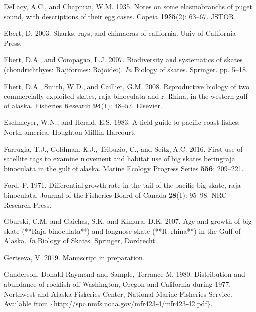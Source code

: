 \documentclass[12pt,]{article}
\begin{document}
\leavevmode\hypertarget{ref-DeLacy1935}{}%
DeLacy, A.C., and Chapman, W.M. 1935. Notes on some elasmobranchs of
puget sound, with descriptions of their egg cases. Copeia
\textbf{1935}(2): 63--67. JSTOR.

\leavevmode\hypertarget{ref-Ebert2003}{}%
Ebert, D. 2003. Sharks, rays, and chimaeras of california. Univ of
California Press.

\leavevmode\hypertarget{ref-Ebert2007}{}%
Ebert, D.A., and Compagno, L.J. 2007. Biodiversity and systematics of
skates (chondrichthyes: Rajiformes: Rajoidei). \emph{In} Biology of
skates. Springer. pp. 5--18.

\leavevmode\hypertarget{ref-Ebert2008}{}%
Ebert, D.A., Smith, W.D., and Cailliet, G.M. 2008. Reproductive biology
of two commercially exploited skates, raja binoculata and r. Rhina, in
the western gulf of alaska. Fisheries Research \textbf{94}(1): 48--57.
Elsevier.

\leavevmode\hypertarget{ref-Eschmeyer1983}{}%
Eschmeyer, W.N., and Herald, E.S. 1983. A field guide to pacific coast
fishes: North america. Houghton Mifflin Harcourt.

\leavevmode\hypertarget{ref-Farrugia2016}{}%
Farrugia, T.J., Goldman, K.J., Tribuzio, C., and Seitz, A.C. 2016. First
use of satellite tags to examine movement and habitat use of big skates
beringraja binoculata in the gulf of alaska. Marine Ecology Progress
Series \textbf{556}: 209--221.

\leavevmode\hypertarget{ref-Ford1971}{}%
Ford, P. 1971. Differential growth rate in the tail of the pacific big
skate, raja binoculata. Journal of the Fisheries Board of Canada
\textbf{28}(1): 95--98. NRC Research Press.

\leavevmode\hypertarget{ref-Gburski2007}{}%
Gburski, C.M. and Gaichas, S.K. and Kimura, D.K. 2007. Age and growth of
big skate (**Raja binoculata**) and longnose skate (**R. rhina**) in the
Gulf of Alaska. \emph{In} Biology of Skates. Springer, Dordrecht.

\leavevmode\hypertarget{ref-Gertseva2019}{}%
Gertseva, V. 2019. Manuscript in preparation.

\leavevmode\hypertarget{ref-Gunderson1980}{}%
Gunderson, Donald Raymond and Sample, Terrance M. 1980. Distribution and
abundance of rockfish off Washington, Oregon and California during 1977.
Northwest and Alaska Fisheries Center, National Marine Fisheries
Service. Available from
\href{\%7Bhttp://spo.nmfs.noaa.gov/mfr423-4/mfr423-42.pdf\%7D}{\{http://spo.nmfs.noaa.gov/mfr423-4/mfr423-42.pdf\}}.
\end{document}
